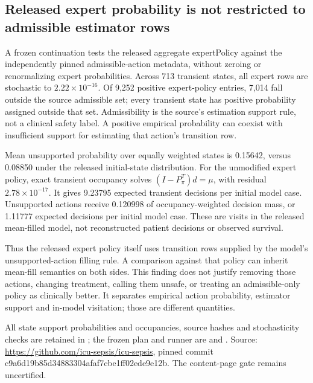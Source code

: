 \subsection{Released expert probability is not restricted to admissible estimator rows}
A frozen continuation tests the released aggregate expertPolicy against the independently pinned admissible-action metadata, without zeroing or renormalizing expert probabilities. Across 713 transient states, all expert rows are stochastic to $2.22\times10^{-16}$. Of 9,252 positive expert-policy entries, 7,014 fall outside the source admissible set; every transient state has positive probability assigned outside that set. Admissibility is the source's estimation support rule, not a clinical safety label. A positive empirical probability can coexist with insufficient support for estimating that action's transition row.

Mean unsupported probability over equally weighted states is 0.15642, versus 0.08850 under the released initial-state distribution. For the unmodified expert policy, exact transient occupancy solves $(I-P_\pi^T)d=\mu$, with residual $2.78\times10^{-17}$. It gives 9.23795 expected transient decisions per initial model case. Unsupported actions receive 0.120998 of occupancy-weighted decision mass, or 1.11777 expected decisions per initial model case. These are visits in the released mean-filled model, not reconstructed patient decisions or observed survival.

Thus the released expert policy itself uses transition rows supplied by the model's unsupported-action filling rule. A comparison against that policy can inherit mean-fill semantics on both sides. This finding does not justify removing those actions, changing treatment, calling them unsafe, or treating an admissible-only policy as clinically better. It separates empirical action probability, estimator support and in-model visitation; those are different quantities.

All state support probabilities and occupancies, source hashes and stochasticity checks are retained in ; the frozen plan and runner are  and . Source: \url{https://github.com/icu-sepsis/icu-sepsis}, pinned commit c9a6d19b85d34883304afaf7cbe1ff02ede9e12b. The content-page gate remains uncertified.
